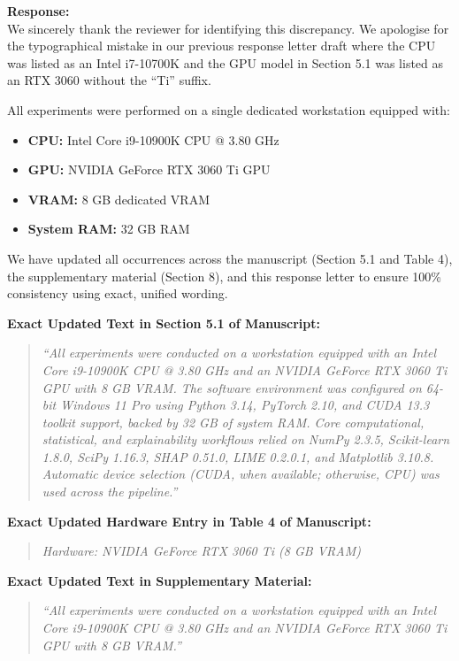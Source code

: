 \documentclass[11pt]{article}
\newcommand{\response}[1]{
  \noindent
  \textbf{Response:} \\
  #1
  \vspace{1.5em}
}
\begin{document}
\response{We sincerely thank the reviewer for identifying this discrepancy. We apologise for the typographical mistake in our previous response letter draft where the CPU was listed as an Intel i7-10700K and the GPU model in Section 5.1 was listed as an RTX 3060 without the ``Ti'' suffix.

All experiments were performed on a single dedicated workstation equipped with:
\begin{itemize}
    \item \textbf{CPU:} Intel Core i9-10900K CPU @ 3.80 GHz
    \item \textbf{GPU:} NVIDIA GeForce RTX 3060 Ti GPU
    \item \textbf{VRAM:} 8 GB dedicated VRAM
    \item \textbf{System RAM:} 32 GB RAM
\end{itemize}

We have updated all occurrences across the manuscript (Section 5.1 and Table 4), the supplementary material (Section 8), and this response letter to ensure 100\% consistency using exact, unified wording.

\vspace{0.5em}
\noindent\textbf{Exact Updated Text in Section 5.1 of Manuscript:}
\begin{quote}
\textit{``All experiments were conducted on a workstation equipped with an Intel Core i9-10900K CPU @ 3.80 GHz and an NVIDIA GeForce RTX 3060 Ti GPU with 8 GB VRAM. The software environment was configured on 64-bit Windows 11 Pro using Python 3.14, PyTorch 2.10, and CUDA 13.3 toolkit support, backed by 32 GB of system RAM. Core computational, statistical, and explainability workflows relied on NumPy 2.3.5, Scikit-learn 1.8.0, SciPy 1.16.3, SHAP 0.51.0, LIME 0.2.0.1, and Matplotlib 3.10.8. Automatic device selection (CUDA, when available; otherwise, CPU) was used across the pipeline.''}
\end{quote}

\noindent\textbf{Exact Updated Hardware Entry in Table 4 of Manuscript:}
\begin{quote}
\textit{Hardware: NVIDIA GeForce RTX 3060 Ti (8 GB VRAM)}
\end{quote}

\noindent\textbf{Exact Updated Text in Supplementary Material:}
\begin{quote}
\textit{``All experiments were conducted on a workstation equipped with an Intel Core i9-10900K CPU @ 3.80 GHz and an NVIDIA GeForce RTX 3060 Ti GPU with 8 GB VRAM.''}
\end{quote}
}
\end{document}

